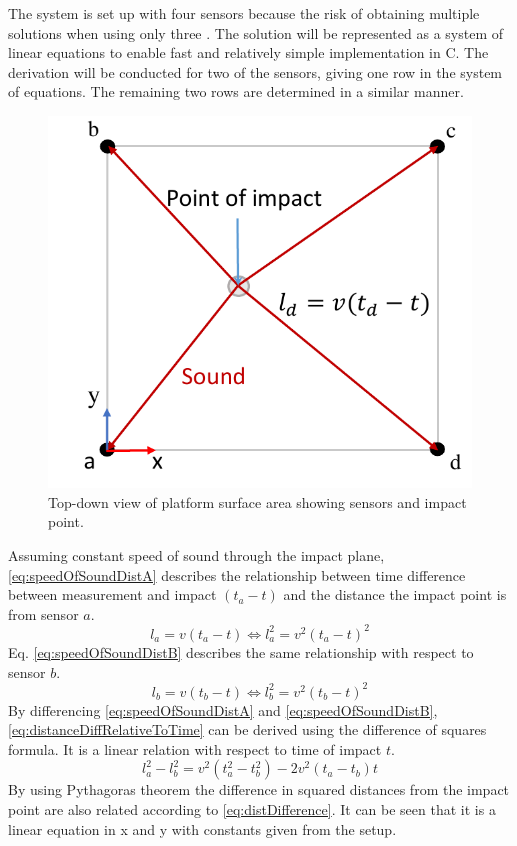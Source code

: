 	The system is set up with four sensors because the risk of obtaining multiple solutions when using only three \cite{tdoa_book}.
	The solution will be represented as a system of linear equations to enable fast and relatively simple implementation in C.
	The derivation will be conducted for two of the sensors, giving one row in the system of equations. The remaining two rows are determined in a similar manner.
	\begin{figure}[htb]
		\centering
		\includegraphics[width=.6\textwidth]{figures/tdoa_model}
		\caption{Top-down view of platform surface area showing sensors and impact point.}
		\label{fig:tdoa_model}
	\end{figure}
	Assuming constant speed of sound through the impact plane, \eqref{eq:speedOfSoundDistA} describes the relationship between time difference between measurement and impact $(t_a - t)$ and the distance the impact point is from sensor $a$.
	\begin{equation}
		l_a = v(t_a - t) \Leftrightarrow l_a^2 = v^2(t_a - t)^2
		\label{eq:speedOfSoundDistA}
	\end{equation}
	Eq. \ref{eq:speedOfSoundDistB} describes the same relationship with respect to sensor $b$.
	\begin{equation}
		l_b = v(t_b - t) \Leftrightarrow l_b^2 = v^2(t_b - t)^2
	\label{eq:speedOfSoundDistB}
	\end{equation}
	By differencing \eqref{eq:speedOfSoundDistA} and \eqref{eq:speedOfSoundDistB}, \eqref{eq:distanceDiffRelativeToTime} can be derived using the difference of squares formula. It is a linear relation with respect to time of impact $t$.
	\begin{equation}
		l_a^2 - l_b^2 = v^2(t_a^2 - t_b^2) - 2 v^2 (t_a - t_b) t
		\label{eq:distanceDiffRelativeToTime}
	\end{equation}
	By using Pythagoras theorem the difference in squared distances from the impact point are also related according to \eqref{eq:distDifference}. It can be seen that it is a linear equation in x and y with constants given from the setup.
